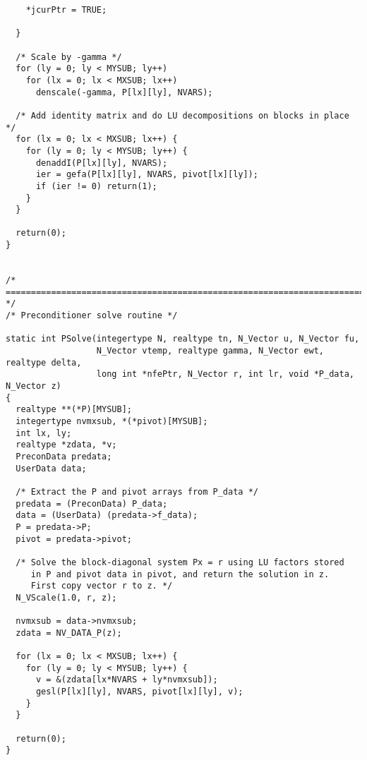 \begin{verbatim}
    *jcurPtr = TRUE;

  }

  /* Scale by -gamma */
  for (ly = 0; ly < MYSUB; ly++)
    for (lx = 0; lx < MXSUB; lx++)
      denscale(-gamma, P[lx][ly], NVARS);
  
  /* Add identity matrix and do LU decompositions on blocks in place */
  for (lx = 0; lx < MXSUB; lx++) {
    for (ly = 0; ly < MYSUB; ly++) {
      denaddI(P[lx][ly], NVARS);
      ier = gefa(P[lx][ly], NVARS, pivot[lx][ly]);
      if (ier != 0) return(1);
    }
  }
  
  return(0);
}


/* ======================================================================= */
/* Preconditioner solve routine */

static int PSolve(integertype N, realtype tn, N_Vector u, N_Vector fu, 
                  N_Vector vtemp, realtype gamma, N_Vector ewt, realtype delta, 
                  long int *nfePtr, N_Vector r, int lr, void *P_data, N_Vector z)
{
  realtype **(*P)[MYSUB];
  integertype nvmxsub, *(*pivot)[MYSUB];
  int lx, ly;
  realtype *zdata, *v;
  PreconData predata;
  UserData data;

  /* Extract the P and pivot arrays from P_data */
  predata = (PreconData) P_data;
  data = (UserData) (predata->f_data);
  P = predata->P;
  pivot = predata->pivot;

  /* Solve the block-diagonal system Px = r using LU factors stored
     in P and pivot data in pivot, and return the solution in z.
     First copy vector r to z. */
  N_VScale(1.0, r, z);

  nvmxsub = data->nvmxsub;
  zdata = NV_DATA_P(z);

  for (lx = 0; lx < MXSUB; lx++) {
    for (ly = 0; ly < MYSUB; ly++) {
      v = &(zdata[lx*NVARS + ly*nvmxsub]);
      gesl(P[lx][ly], NVARS, pivot[lx][ly], v);
    }
  }

  return(0);
}
\end{verbatim}